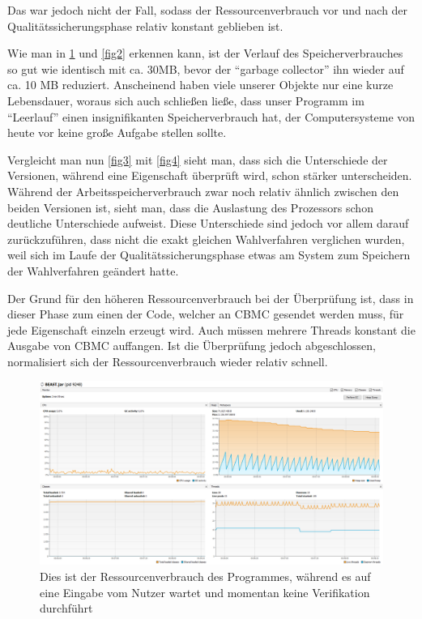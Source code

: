 \documentclass[a4paper]{scrreprt}
\begin{document}
Das war jedoch nicht der Fall, sodass der Ressourcenverbrauch vor und nach der
Qualitätssicherungsphase relativ konstant geblieben ist.

Wie man in \ref{fig1} und \ref{fig2} erkennen kann, ist der Verlauf des
Speicherverbrauches so gut wie identisch mit ca. 30MB, bevor der "`garbage
collector"' ihn wieder auf ca. 10 MB reduziert. Anscheinend haben viele
unserer Objekte nur eine kurze Lebensdauer, woraus sich auch schließen ließe,
dass unser Programm im "`Leerlauf"' einen insignifikanten Speicherverbrauch hat,
der Computersysteme von heute vor keine große Aufgabe stellen sollte.

Vergleicht man nun \ref{fig3} mit \ref{fig4} sieht man, dass sich die
Unterschiede der Versionen, während eine Eigenschaft überprüft wird, schon
stärker unterscheiden. Während der Arbeitsspeicherverbrauch zwar noch relativ
ähnlich zwischen den beiden Versionen ist, sieht man, dass die Auslastung des
Prozessors schon deutliche Unterschiede aufweist. Diese Unterschiede sind jedoch vor allem darauf
zurückzuführen, dass nicht die exakt gleichen Wahlverfahren verglichen
wurden, weil sich im Laufe der Qualitätssicherungsphase etwas am System zum
Speichern der Wahlverfahren geändert hatte.

Der Grund für den höheren Ressourcenverbrauch bei der Überprüfung ist, dass in dieser Phase zum einen der Code, welcher an CBMC gesendet
werden muss, für jede Eigenschaft einzeln erzeugt wird. Auch müssen mehrere Threads
konstant die Ausgabe von CBMC auffangen.
Ist die Überprüfung jedoch abgeschlossen, normalisiert sich der
Ressourcenverbrauch wieder relativ schnell.

\newpage
\begin{figure}[ht]
	\centering
  \includegraphics[width=1.0\textwidth,
  height=0.40\textwidth]{images/OLD_NO.png} \caption{Dies ist der
  Ressourcenverbrauch des Programmes, während es auf eine Eingabe vom Nutzer wartet und momentan keine Verifikation durchführt}
	\label{fig1}
\end{figure}
\end{document}
